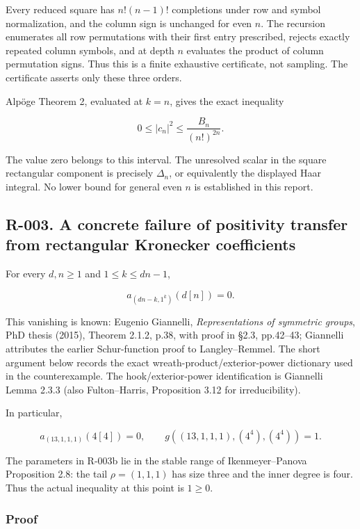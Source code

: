 \documentclass[
  10pt,
]{article}
\begin{document}
Every reduced square has \(n!(n-1)!\) completions under row and symbol
normalization, and the column sign is unchanged for even \(n\). The
recursion enumerates all row permutations with their first entry
prescribed, rejects exactly repeated column symbols, and at depth \(n\)
evaluates the product of column permutation signs. Thus this is a finite
exhaustive certificate, not sampling. The certificate asserts only these
three orders.

Alpöge Theorem 2, evaluated at \(k=n\), gives the exact inequality

\[
0\le |c_n|^2\le\frac{B_n}{(n!)^{2n}}.
\tag{R-002b}
\]

The value zero belongs to this interval. The unresolved scalar in the
square rectangular component is precisely \(\Delta_n\), or equivalently
the displayed Haar integral. No lower bound for general even \(n\) is
established in this report.

\subsection{R-003. A concrete failure of positivity transfer from
rectangular Kronecker
coefficients}\label{r-003.-a-concrete-failure-of-positivity-transfer-from-rectangular-kronecker-coefficients}

For every \(d,n\ge1\) and \(1\le k\le dn-1\),

\[
a_{(dn-k,1^k)}(d[n])=0.
\tag{R-003a}
\]

This vanishing is known: Eugenio Giannelli, \emph{Representations of
symmetric groups}, PhD thesis (2015), Theorem 2.1.2, p.38, with proof in
§2.3, pp.42--43; Giannelli attributes the earlier Schur-function proof
to Langley--Remmel. The short argument below records the exact
wreath-product/exterior-power dictionary used in the counterexample. The
hook/exterior-power identification is Giannelli Lemma 2.3.3 (also
Fulton--Harris, Proposition 3.12 for irreducibility).

In particular,

\[
\boxed{a_{(13,1,1,1)}(4[4])=0,\qquad
g((13,1,1,1),(4^4),(4^4))=1.}
\tag{R-003b}
\]

The parameters in R-003b lie in the stable range of Ikenmeyer--Panova
Proposition 2.8: the tail \(\rho=(1,1,1)\) has size three and the inner
degree is four. Thus the actual inequality at this point is \(1\ge0\).

\subsubsection{Proof}\label{proof-1}
\end{document}

